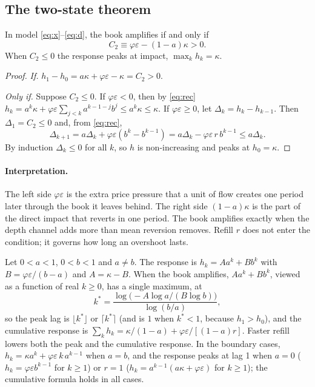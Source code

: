 \subsection{The two-state theorem}

\begin{theorem}\label{thm:t6}
In model \eqref{eq:x}--\eqref{eq:d}, the book amplifies if and only if
\[
C_2\equiv\varphi\varepsilon-(1-a)\kappa>0 .
\]
When $C_2\le0$ the response peaks at impact, $\max_kh_k=\kappa$.
\end{theorem}

\begin{proof}
\emph{If.} $h_1-h_0=a\kappa+\varphi\varepsilon-\kappa=C_2>0$.

\emph{Only if.} Suppose $C_2\le0$. If $\varphi\varepsilon<0$, then by \eqref{eq:rec} $h_k=a^k\kappa+\varphi\varepsilon\sum_{j<k}a^{k-1-j}b^j\le a^k\kappa\le\kappa$. If $\varphi\varepsilon\ge0$, let $\Delta_k=h_k-h_{k-1}$. Then $\Delta_1=C_2\le0$ and, from \eqref{eq:rec},
\[
\Delta_{k+1}=a\Delta_k+\varphi\varepsilon(b^{k}-b^{k-1})=a\Delta_k-\varphi\varepsilon\,r\,b^{k-1}\le a\Delta_k .
\]
By induction $\Delta_k\le0$ for all $k$, so $h$ is non-increasing and peaks at $h_0=\kappa$.
\end{proof}

\paragraph{Interpretation.} The left side $\varphi\varepsilon$ is the extra price pressure that a unit of flow creates one period later through the book it leaves behind. The right side $(1-a)\kappa$ is the part of the direct impact that reverts in one period. The book amplifies exactly when the depth channel adds more than mean reversion removes. Refill $r$ does not enter the condition; it governs how long an overshoot lasts.

\begin{proposition}\label{prop:shape}
Let $0<a<1$, $0<b<1$ and $a\neq b$. The response is $h_k=Aa^k+Bb^k$ with $B=\varphi\varepsilon/(b-a)$ and $A=\kappa-B$. When the book amplifies, $Aa^k+Bb^k$, viewed as a function of real $k\ge0$, has a single maximum, at
\[
k^*=\frac{\log\bigl(-A\log a/(B\log b)\bigr)}{\log(b/a)},
\]
so the peak lag is $\lfloor k^*\rfloor$ or $\lceil k^*\rceil$ (and is $1$ when $k^*<1$, because $h_1>h_0$), and the cumulative response is $\sum_kh_k=\kappa/(1-a)+\varphi\varepsilon/[(1-a)r]$. Faster refill lowers both the peak and the cumulative response. In the boundary cases, $h_k=\kappa a^k+\varphi\varepsilon\,k\,a^{k-1}$ when $a=b$, and the response peaks at lag 1 when $a=0$ ($h_k=\varphi\varepsilon b^{k-1}$ for $k\ge1$) or $r=1$ ($h_k=a^{k-1}(a\kappa+\varphi\varepsilon)$ for $k\ge1$); the cumulative formula holds in all cases.
\end{proposition}

